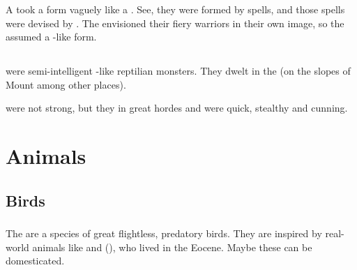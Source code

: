 A \firesalamander took a form vaguely like a \dragon. 
See, they were formed by spells, and those spells were devised by \dragons. 
The \dragons envisioned their fiery warriors in their own image, so the \firesalamanders assumed a \dragon-like form. 















\section{\Werloc}
\index{\werloc}
\Werlocs were semi-intelligent \scatha-like reptilian monsters. 
They dwelt in the \wylde (on the slopes of Mount  among other places). 

\Werlocs were not strong, but they \traveled in great hordes and were quick, stealthy and cunning.






















 

\chapter{Animals}















\section{Birds}














\subsection{\Grulcan}
The \grulcans{} are a species of great flightless, predatory birds. 
They are inspired by real-world animals like  and  (), who lived in the Eocene. 
Maybe these can be domesticated.

